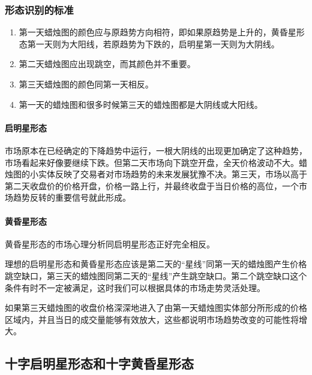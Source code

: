 \subsubsection*{形态识别的标准}
\begin{enumerate}
    \item 第一天蜡烛图的颜色应与原趋势方向相符，即如果原趋势是上升的，黄昏星形态第一天则为大阳线，若原趋势为下跌的，启明星第一天则为大阴线。
    \item 第二天蜡烛图应出现跳空，而其颜色并不重要。
    \item 第三天蜡烛图的颜色同第一天相反。
    \item 第一天的蜡烛图和很多时候第三天的蜡烛图都是大阴线或大阳线。
\end{enumerate}

\paragraph{启明星形态} 市场原本在已经确定的下降趋势中运行，一根大阴线的出现更加确定了这种趋势，市场看起来好像要继续下跌。但第二天市场向下跳空开盘，全天价格波动不大。蜡烛图的小实体反映了交易者对市场趋势的未来发展犹豫不决。第三天，市场以高于第二天收盘价的价格开盘，价格一路上行，并最终收盘于当日价格的高位，一个市场趋势反转的重要信号就此形成。


\paragraph{黄昏星形态} 黄昏星形态的市场心理分析同启明星形态正好完全相反。

理想的启明星形态和黄昏星形态应该是第二天的“星线”同第一天的蜡烛图产生价格跳空缺口，第三天的蜡烛图同第二天的“星线”产生跳空缺口。第二个跳空缺口这个条件有时不一定被满足，这时我们可以根据具体的市场走势灵活处理。

如果第三天蜡烛图的收盘价格深深地进入了由第一天蜡烛图实体部分所形成的价格区域内，并且当日的成交量能够有效放大，这些都说明市场趋势改变的可能性将增大。
\subsection{十字启明星形态和十字黄昏星形态}
